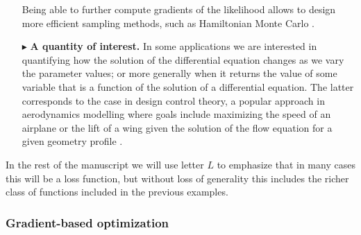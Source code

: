 \begin{itemize}
    Being able to further compute gradients of the likelihood allows to design more efficient sampling methods, such as Hamiltonian Monte Carlo \cite{Betancourt_2017}.
    \item[$ \blacktriangleright$] \textbf{A quantity of interest.} In some applications we are interested in quantifying how the solution of the differential equation changes as we vary the parameter values; or more generally when it returns the value of some variable that is a function of the solution of a differential equation. The latter corresponds to the case in design control theory, a popular approach in aerodynamics modelling where goals include maximizing the speed of an airplane or the lift of a wing given the solution of the flow equation for a given geometry profile \cite{Jameson_1988,Giles_Pierce_2000,Mohammadi:2004dg}. 
\end{itemize}
In the rest of the manuscript we will use letter $L$ to emphasize that in many cases this will be a loss function, but without loss of generality this includes the richer class of functions included in the previous examples. 

\subsubsection{Gradient-based optimization}

